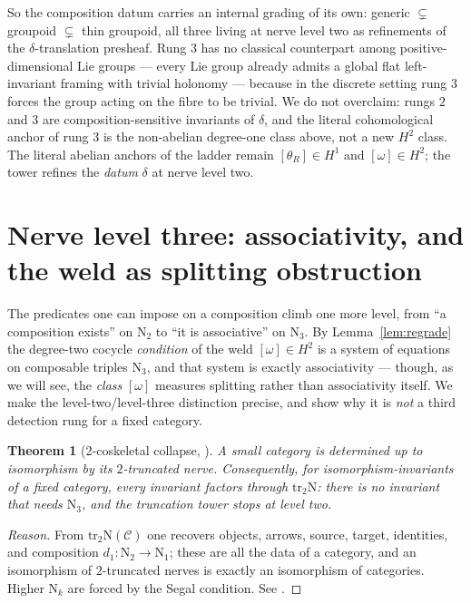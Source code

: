 \documentclass[11pt]{article}
\newtheorem{theorem}{Theorem}
\theoremstyle{definition}
\newcommand{\tr}{\mathrm{tr}}
\newcommand{\cC}{\mathcal{C}}
\newcommand{\Nerve}{\mathrm{N}}
\begin{document}
So the composition datum carries an internal grading of its own: generic $\subsetneq$ groupoid
$\subsetneq$ thin groupoid, all three living at nerve level two as refinements of the
$\delta$-translation presheaf. Rung $3$ has no classical counterpart among positive-dimensional Lie
groups --- every Lie group already admits a global flat left-invariant framing with trivial holonomy
--- because in the discrete setting rung $3$ forces the group acting on the fibre to be trivial. We do
not overclaim: rungs $2$ and $3$ are composition-sensitive invariants of $\delta$, and the literal
cohomological anchor of rung $3$ is the non-abelian degree-one class above, not a new $H^2$ class. The
literal abelian anchors of the ladder remain $[\theta_R]\in H^1$ and $[\omega]\in H^2$; the tower
refines the \emph{datum} $\delta$ at nerve level two.

\section{Nerve level three: associativity, and the weld as splitting obstruction}\label{sec:lvl3}

The predicates one can impose on a composition climb one more level, from ``a composition exists'' on
$\Nerve_2$ to ``it is associative'' on $\Nerve_3$. By Lemma~\ref{lem:regrade} the degree-two cocycle
\emph{condition} of the weld $[\omega]\in H^2$ is a system of equations on composable triples
$\Nerve_3$, and that system is exactly associativity --- though, as we will see, the \emph{class}
$[\omega]$ measures splitting rather than associativity itself. We make the level-two/level-three
distinction precise, and show why it is \emph{not} a third detection rung for a fixed category.

\begin{theorem}[2-coskeletal collapse, \cite{MacBethNerve}]\label{thm:coskel}
A small category is determined up to isomorphism by its $2$-truncated nerve. Consequently, for
isomorphism-invariants of a fixed category, every invariant factors through $\tr_2\Nerve$: there is no
invariant that needs $\Nerve_3$, and the truncation tower stops at level two.
\end{theorem}

\begin{proof}[Reason]
From $\tr_2\Nerve(\cC)$ one recovers objects, arrows, source, target, identities, and composition
$d_1\colon\Nerve_2\to\Nerve_1$; these are all the data of a category, and an isomorphism of
$2$-truncated nerves is exactly an isomorphism of categories. Higher $\Nerve_k$ are forced by the
Segal condition. See \cite{MacBethNerve}.
\end{proof}
\end{document}
